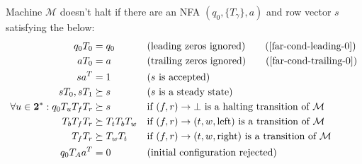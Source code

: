 \begin{theorem}\normalfont
  \label{far-main-theorem}
  Machine $\mathcal{M}$ doesn't halt if there are an NFA $(q_0, \{T_\gamma\}, a)$ and row vector $s$ satisfying the below:
  \begin{align}
    \label{far-cond-first}
    q_0 T_0                                  & = q_0
                                             &                     & \text{(leading zeros ignored)}
    \tag{\ref{far-cond-leading-0}}
    \\
    a T_0                                    & = a
                                             &                     & \text{(trailing zeros ignored)}
    \tag{\ref{far-cond-trailing-0}}
    \\
    sa\T                                     & = 1
                                             &                     & \text{($s$ is accepted)}
    \label{far-cond-ass-accepted}
    \\
    sT_0,sT_1                                & \succeq s
                                             &                     & \text{($s$ is a steady state)}
    \label{far-cond-ass-steady}
    \\
    \forall u\in\mathbf{2}^*: q_0T_u T_f T_r & \succeq s
                                             &                     & \text{if $(f,r) \to \bot$ is a halting transition of $\mathcal{M}$}
    \label{far-cond-halt}
    \\
    T_b T_f T_r                              & \succeq T_t T_b T_w
                                             &                     & \text{if $(f,r) \to (t,w,\text{left})$ is a transition of $\mathcal{M}$}
    \label{far-cond-left}
    \\
    T_f T_r                                  & \succeq T_w T_t
                                             &                     & \text{if $(f,r) \to (t,w,\text{right})$ is a transition of $\mathcal{M}$}
    \label{far-cond-last}
    \\
    q_0 T_A a\T                              & = 0
                                             &                     & \text{(initial configuration rejected)}
    \label{far-cond-reject-start}
  \end{align}
\end{theorem}


